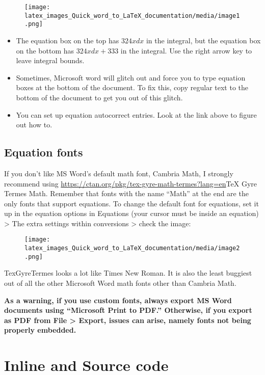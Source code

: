 \documentclass[12pt]{article}
\providecommand{\href}[1]{\url{#1}}
\theoremstyle{plain}
\theoremstyle{remark}
\theoremstyle{definition}
\begin{document}
\begin{figure}[H]
\centering
\texttt{[image: latex\_images\_Quick\_word\_to\_LaTeX\_documentation/media/image1.png]}
\end{figure}

\begin{itemize}
\item
  The equation box on the top has \(324xdx\) in the integral, but the
  equation box on the bottom has \(324xdx + 333\) in the integral. Use
  the right arrow key to leave integral bounds.
\item
  Sometimes, Microsoft word will glitch out and force you to type
  equation boxes at the bottom of the document. To fix this, copy
  regular text to the bottom of the document to get you out of this
  glitch.
\item
  You can set up equation autocorrect entries. Look at the link above to
  figure out how to.
\end{itemize}


\subsection{Equation fonts}

If you don't like MS Word's default math font, Cambria Math, I strongly
recommend using
\href{https://ctan.org/pkg/tex-gyre-math-termes?lang=en}{TeX Gyre Termes
Math.} Remember that fonts with the name ``Math'' at the end are the
only fonts that support equations. To change the default font for
equations, set it up in the equation options in Equations (your cursor
must be inside an equation) \textgreater{} The extra settings within
conversions \textgreater{} check the image:


\begin{figure}[H]
\centering
\texttt{[image: latex\_images\_Quick\_word\_to\_LaTeX\_documentation/media/image2.png]}
\end{figure}

TexGyreTermes looks a lot like Times New Roman. It is also the least
buggiest out of all the other Microsoft Word math fonts other than
Cambria Math.

\textbf{As a warning, if you use custom fonts, always export MS Word
documents using ``Microsoft Print to PDF.'' Otherwise, if you export as
PDF from File \textgreater{} Export, issues can arise, namely fonts not
being properly embedded.}


\section{Inline and Source code}
\end{document}
